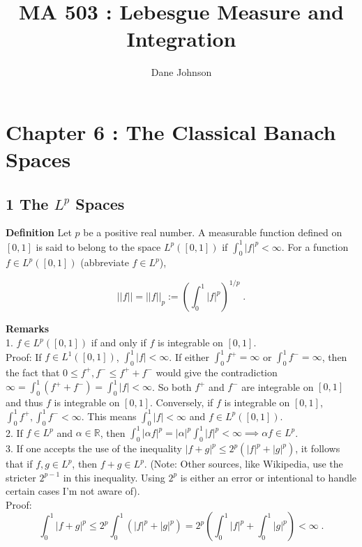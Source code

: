 \documentclass[a4paper]{article}
\title{MA 503 : Lebesgue Measure and Integration}
\author{Dane Johnson}
\begin{document}
\maketitle

\section*{Chapter 6 : The Classical Banach Spaces}

\subsection*{1 The $L^p$ Spaces}

{\bf Definition} Let $p$ be a positive real number. A measurable function defined on $[0,1]$ is said to belong to the space $L^p([0,1])$ if $\int_0^1 |f|^p < \infty$. For a function $f \in L^p([0,1])$ (abbreviate $f \in L^p$), 

$$||f|| = ||f||_p := \left(\int_0^1 |f|^p \right)^{1/p} \;.$$

{\bf Remarks}\\

1. $f \in L^p([0,1])$ if and only if $f$ is integrable on $[0,1]$.\\

Proof: If $f \in L^1([0,1])$, $\int_0^1 |f| < \infty$. If either $\int_0^1 f^+ = \infty$ or $\int_0^1 f^- = \infty$, then the fact that $0\leq f^+,f^- \leq f^+ + f^-$ would give the contradiction $\infty = \int_0^1 (f^+ + f^-) = \int_0^1 |f| < \infty$. So both $f^+$ and $f^-$ are integrable on $[0,1]$ and thus $f$ is integrable on $[0,1]$. Conversely, if $f$ is integrable on $[0,1]$, $\int_0^1 f^+ , \int_0^1 f^- < \infty$. This means $\int_0^1 |f| < \infty$ and $f \in L^p([0,1])$.\\

2. If $f \in L^p$ and $\alpha \in \mathbb{R}$, then $\int_0^1 |\alpha f|^p = |\alpha|^p \int_0^1 |f|^p < \infty \implies \alpha f \in L^p$. \\

3. If one accepts the use of the inequality $|f + g|^p \leq 2^p(|f|^p + |g|^p)$, it follows that if $f,g \in L^p$, then $f+g \in L^p$. (Note: Other sources, like Wikipedia, use the stricter $2^{p-1}$ in this inequality. Using $2^p$ is either an error or intentional to handle certain cases I'm not aware of).\\

Proof: $$\int_0^1 |f+g|^p  \leq 2^p \int_0^1 (|f|^p + |g|^p) = 2^p \left(\int_0^1 |f|^p + \int_0^1 |g|^p\right) < \infty \;.$$
\end{document}
